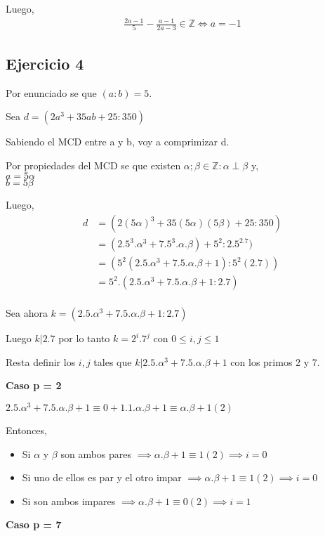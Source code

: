 Luego,
\begin{align*}
    \frac{2a-1}{5} - \frac{a-1}{2a-3} \in \mathbb{Z} \iff a = -1  
\end{align*}

\subsection{Ejercicio 4}

Por enunciado se que $ (a:b) = 5 $.

Sea $ d = (2a^3 + 35ab + 25: 350) $

Sabiendo el MCD entre a y b, voy a comprimizar d.

Por propiedades del MCD se que existen $ \alpha; \beta \in \mathbb{Z}: \alpha \perp \beta $ y, \\
$ a = 5\alpha $\\
$ b = 5\beta $

Luego,
\begin{align*}
    d &= ( 2(5\alpha)^3 + 35(5\alpha)(5\beta) + 25:350 ) \\
    &= ( 2.5^3.\alpha^3 + 7.5^3.\alpha.\beta) + 5^2:2.5^2.7 ) \\
    &= ( 5^2(2.5.\alpha^3 + 7.5.\alpha.\beta + 1):5^2(2.7) ) \\
    &= 5^2.( 2.5.\alpha^3 + 7.5.\alpha.\beta + 1:2.7 ) \\
\end{align*}

Sea ahora $ k = (2.5.\alpha^3 + 7.5.\alpha.\beta + 1:2.7) $

Luego $ k|2.7 $ por lo tanto $ k = 2^i.7^j $ con $ 0\leq i, j \leq 1 $

Resta definir los $ i,j $ tales que $ k|2.5.\alpha^3 + 7.5.\alpha.\beta + 1 $ con los primos 2 y 7.

\textbf{Caso p = 2}

$ 2.5.\alpha^3 + 7.5.\alpha.\beta + 1 \equiv 0 + 1.1.\alpha.\beta + 1 \equiv \alpha.\beta + 1 (2)$

Entonces,
\begin{itemize}
    \item Si $ \alpha $ y $ \beta $ son ambos pares $ \implies \alpha.\beta + 1 \equiv 1(2) \implies i = 0$
    \item Si uno de ellos es par y el otro impar $ \implies \alpha.\beta + 1 \equiv 1(2) \implies i = 0 $
    \item Si son ambos impares $ \implies \alpha.\beta + 1 \equiv 0(2) \implies i = 1 $
\end{itemize}
\textbf{Caso p = 7}

